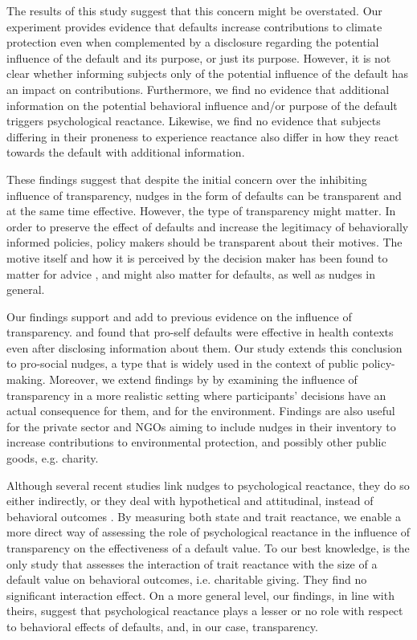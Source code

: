 \documentclass[review, authoryear,12pt]{elsarticle}
\begin{document}
The results of this study suggest that this concern might be overstated. Our experiment provides evidence that defaults increase contributions to climate protection even when complemented by a disclosure regarding the potential influence of the default and its purpose, or just its purpose. However, it is not clear whether informing subjects only of the potential influence of the default has an impact on contributions. Furthermore, we find no evidence that additional information on the potential behavioral influence and/or purpose of the default triggers psychological reactance. Likewise, we find no evidence that subjects differing in their proneness to experience reactance also differ in how they react towards the default with additional information.

These findings suggest that despite the initial concern over the inhibiting influence of transparency, nudges in the form of defaults can be transparent and at the same time effective. However, the type of transparency might matter. In order to preserve the effect of defaults and increase the legitimacy of behaviorally informed policies, policy makers should be transparent about their motives. The motive itself and how it is perceived by the decision maker has been found to matter for advice \citep{Kuang.2007}, and might also matter for defaults, as well as nudges in general.

Our findings support and add to previous evidence on the influence of transparency. \cite{Loewenstein.2015} and \cite{Kroese.2016} found that pro-self defaults were effective in health contexts even after disclosing information about them. Our study extends this conclusion to pro-social nudges, a type that is widely used in the context of public policy-making. Moreover, we extend findings by \cite{Steffel.2016} by examining the influence of transparency in a more realistic setting where participants' decisions have an actual consequence for them, and for the environment. Findings are also useful for the private sector and NGOs aiming to include nudges in their inventory to increase contributions to environmental protection, and possibly other public goods, e.g. charity.

Although several recent studies link nudges to psychological reactance, they do so either indirectly, or they deal with hypothetical and attitudinal, instead of behavioral outcomes \citep{Haggag.2014, Arad.2015, Loewenstein.2015, Hedlin.2016}. By measuring both state and trait reactance, we enable a more direct way of assessing the role of psychological reactance in the influence of transparency on the effectiveness of a default value. To our best knowledge, \cite{Goswami.2016} is the only study that assesses the interaction of trait reactance with the size of a default value on behavioral outcomes, i.e. charitable giving. They find no significant interaction effect. On a more general level, our findings, in line with theirs, suggest that psychological reactance plays a lesser or no role with respect to behavioral effects of defaults, and, in our case, transparency.
\end{document}
